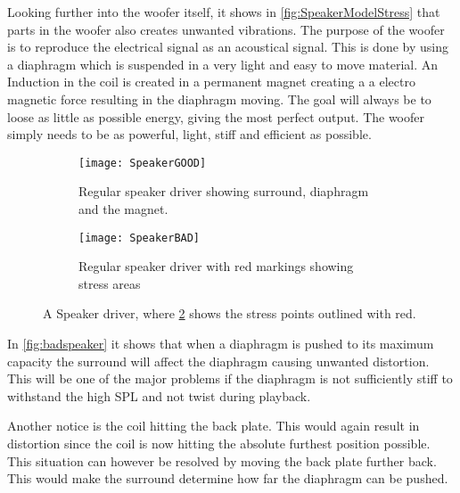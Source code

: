 Looking further into the woofer itself, it shows in \autoref{fig:SpeakerModelStress} that parts in the woofer also creates unwanted vibrations. The purpose of the woofer is to reproduce the electrical signal as an acoustical signal. This is done by using a diaphragm which is suspended in a very light and easy to move material. An Induction in the coil is created in a permanent magnet creating a a electro magnetic force resulting in the diaphragm moving. The goal will always be to loose as little as possible energy, giving the most perfect output. The woofer simply needs to be as powerful, light, stiff and efficient as possible.

\begin{figure}[H]
\centering
\begin{subfigure}[t]{0.47\textwidth}
\texttt{[image: SpeakerGOOD]}
	\caption{Regular speaker driver showing surround, diaphragm and the magnet.}
	\label{fig:regularspeaker}
\end{subfigure}
\hspace{6mm} 
\begin{subfigure}[t]{0.47\textwidth}
\texttt{[image: SpeakerBAD]}
	\caption{Regular speaker driver with red markings showing stress areas}
	\label{fig:badspeaker}
\end{subfigure}
\caption{A Speaker driver, where \ref{fig:badspeaker} shows the stress points outlined with red.}
\label{fig:SpeakerModelStress}
\end{figure}
In \autoref{fig:badspeaker} it shows that when a diaphragm is pushed to its maximum capacity the surround will affect the diaphragm causing unwanted distortion. This will be one of the major problems if the diaphragm is not sufficiently stiff to withstand the high \gls{SPL} and not twist during playback. 

Another notice is the coil hitting the back plate. This would again result in distortion since the coil is now hitting the absolute furthest position possible. This situation can however be resolved by moving the back plate further back. This would make the surround determine how far the diaphragm can be pushed.

% 


